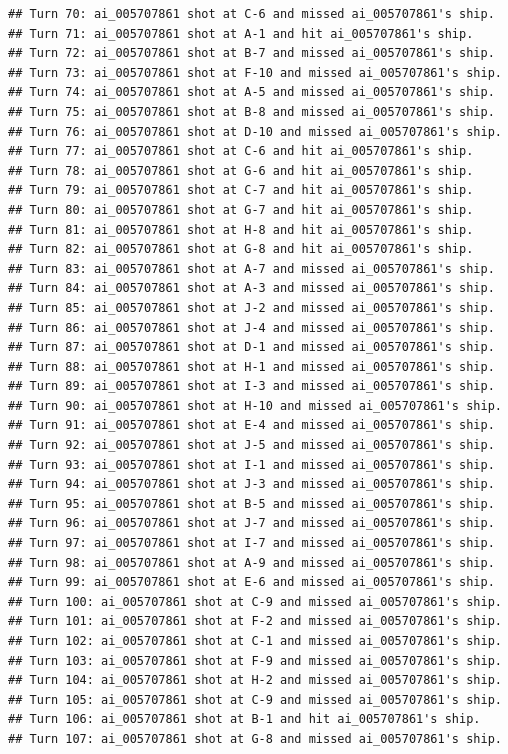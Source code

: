 \documentclass[
]{article}
\begin{document}
\begin{verbatim}
## Turn 70: ai_005707861 shot at C-6 and missed ai_005707861's ship.
## Turn 71: ai_005707861 shot at A-1 and hit ai_005707861's ship.
## Turn 72: ai_005707861 shot at B-7 and missed ai_005707861's ship.
## Turn 73: ai_005707861 shot at F-10 and missed ai_005707861's ship.
## Turn 74: ai_005707861 shot at A-5 and missed ai_005707861's ship.
## Turn 75: ai_005707861 shot at B-8 and missed ai_005707861's ship.
## Turn 76: ai_005707861 shot at D-10 and missed ai_005707861's ship.
## Turn 77: ai_005707861 shot at C-6 and hit ai_005707861's ship.
## Turn 78: ai_005707861 shot at G-6 and hit ai_005707861's ship.
## Turn 79: ai_005707861 shot at C-7 and hit ai_005707861's ship.
## Turn 80: ai_005707861 shot at G-7 and hit ai_005707861's ship.
## Turn 81: ai_005707861 shot at H-8 and hit ai_005707861's ship.
## Turn 82: ai_005707861 shot at G-8 and hit ai_005707861's ship.
## Turn 83: ai_005707861 shot at A-7 and missed ai_005707861's ship.
## Turn 84: ai_005707861 shot at A-3 and missed ai_005707861's ship.
## Turn 85: ai_005707861 shot at J-2 and missed ai_005707861's ship.
## Turn 86: ai_005707861 shot at J-4 and missed ai_005707861's ship.
## Turn 87: ai_005707861 shot at D-1 and missed ai_005707861's ship.
## Turn 88: ai_005707861 shot at H-1 and missed ai_005707861's ship.
## Turn 89: ai_005707861 shot at I-3 and missed ai_005707861's ship.
## Turn 90: ai_005707861 shot at H-10 and missed ai_005707861's ship.
## Turn 91: ai_005707861 shot at E-4 and missed ai_005707861's ship.
## Turn 92: ai_005707861 shot at J-5 and missed ai_005707861's ship.
## Turn 93: ai_005707861 shot at I-1 and missed ai_005707861's ship.
## Turn 94: ai_005707861 shot at J-3 and missed ai_005707861's ship.
## Turn 95: ai_005707861 shot at B-5 and missed ai_005707861's ship.
## Turn 96: ai_005707861 shot at J-7 and missed ai_005707861's ship.
## Turn 97: ai_005707861 shot at I-7 and missed ai_005707861's ship.
## Turn 98: ai_005707861 shot at A-9 and missed ai_005707861's ship.
## Turn 99: ai_005707861 shot at E-6 and missed ai_005707861's ship.
## Turn 100: ai_005707861 shot at C-9 and missed ai_005707861's ship.
## Turn 101: ai_005707861 shot at F-2 and missed ai_005707861's ship.
## Turn 102: ai_005707861 shot at C-1 and missed ai_005707861's ship.
## Turn 103: ai_005707861 shot at F-9 and missed ai_005707861's ship.
## Turn 104: ai_005707861 shot at H-2 and missed ai_005707861's ship.
## Turn 105: ai_005707861 shot at C-9 and missed ai_005707861's ship.
## Turn 106: ai_005707861 shot at B-1 and hit ai_005707861's ship.
## Turn 107: ai_005707861 shot at G-8 and missed ai_005707861's ship.

\end{verbatim}
\end{document}

